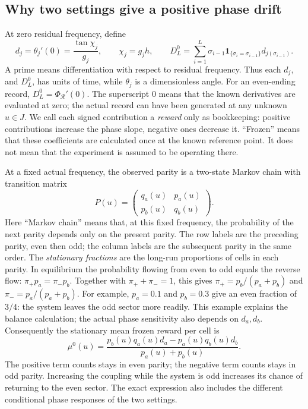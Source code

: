\documentclass[11pt,a4paper]{article}
\numberwithin{equation}{section}
\theoremstyle{remark}
\begin{document}
\subsection{Why two settings give a positive phase drift}
\label{phase:drift}

At zero residual frequency, define
\begin{equation}
 d_j=\theta_j'(0)=\frac{\tan\chi_j}{g_j},
 \qquad \chi_j=g_jh,
 \qquad
 D_L^0=\sum_{i=1}^{L}\sigma_{i-1}
 \mathbf 1_{\{\sigma_i=\sigma_{i-1}\}}d_{j(\sigma_{i-1})}.
 \label{phase:frozen}
\end{equation}
A prime means differentiation with respect to residual frequency.  Thus each
$d_j$, and $D_L^0$, has units of time, while $\theta_j$ is a dimensionless
angle.  For an even-ending record, $D_L^0=\Phi_{\mathcal R}'(0)$.  The
superscript $0$ means that the known derivatives are evaluated at zero; the
actual record can have been generated at any unknown $u\in J$.
We call each signed contribution a \emph{reward} only as bookkeeping:
positive contributions increase the phase slope, negative ones decrease it.
``Frozen'' means that these coefficients are calculated once at the known
reference point.  It does not mean that the experiment is assumed to be
operating there.

At a fixed actual frequency, the observed parity is a two-state Markov chain
with transition matrix
\begin{equation}
 P(u)=\begin{pmatrix}q_a(u)&p_a(u)\\p_b(u)&q_b(u)\end{pmatrix}.
 \label{phase:matrix}
\end{equation}
Here ``Markov chain'' means that, at this fixed frequency, the probability of
the next parity depends only on the present parity.  The row labels are the
preceding parity, even then odd; the column labels are the subsequent parity
in the same order.  The \emph{stationary fractions} are the long-run
proportions of cells in each parity.  In equilibrium the probability flowing
from even to odd equals the reverse flow: $\pi_+p_a=\pi_-p_b$.
Together with $\pi_++\pi_-=1$, this gives
$\pi_+=p_b/(p_a+p_b)$ and $\pi_-=p_a/(p_a+p_b)$.  For example,
$p_a=0.1$ and $p_b=0.3$ give an even fraction of $3/4$: the system leaves
the odd sector more readily.  This example explains the balance calculation;
the actual phase sensitivity also depends on $d_a,d_b$.
Consequently the stationary
mean frozen reward per cell is
\begin{equation}
 \mu^0(u)=
 \frac{p_b(u)q_a(u)d_a-p_a(u)q_b(u)d_b}{p_a(u)+p_b(u)}.
 \label{phase:driftfunction}
\end{equation}
The positive term counts stays in even parity; the negative term counts
stays in odd parity.  Increasing the coupling while the system is odd
increases its chance of returning to the even sector.  The exact expression
also includes the different conditional phase responses of the two settings.
\end{document}
